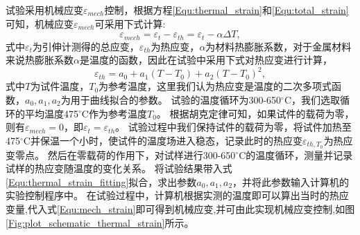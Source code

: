 试验采用机械应变$\varepsilon_{mech}$控制，根据方程\ref{Equ:thermal_strain}和\ref{Equ:total_strain}可知，机械应变$\varepsilon_{mech}$可采用下式计算:
\begin{equation}
\varepsilon_{mech}=\varepsilon_{t}-\varepsilon_{th}=\varepsilon_{t}-\alpha\Delta T,
\label{Equ:mech_strain}
\end{equation}
式中$\varepsilon_{t}$为引伸计测得的总应变，$\varepsilon_{th}$为热应变，$\alpha$为材料热膨胀系数，对于金属材料来说热膨胀系数$\alpha$是温度的函数，因此在试验中采用下式对热应变进行计算，
\begin{equation}
\varepsilon_{th}=a_0+a_1(T-T_0)+a_2(T-T_0)^2,
\label{Equ:thermal_strain_fitting}
\end{equation}
式中$T$为试件温度，$T_0$为参考温度，这里我们认为热应变是温度的二次多项式函数，$a_0,a_1,a_2$为用于曲线拟合的参数。
试验的温度循环为300-650$^\circ$C，我们选取循环的平均温度475$^\circ$C作为参考温度$T_0$。
根据胡克定律可知，如果试件的载荷为零，则有$\varepsilon_{mech}=0$，即$\varepsilon_{t}=\varepsilon_{th}$。
试验过程中我们保持试件的载荷为零，将试件加热至475$^\circ$C并保温一个小时，使试件的温度场进入稳态，记录此时的热应变$\varepsilon_{th,T_0}$为热应变零点。
然后在零载荷的作用下，对试样进行300-650$^\circ$C的温度循环，测量并记录试样的热应变随温度的变化关系。
将试验结果带入式\ref{Equ:thermal_strain_fitting}拟合，求出参数$a_0,a_1,a_2$，并将此参数输入计算机的实验控制程序中。
在试验过程中，计算机根据实测的温度即可以算出当时的热应变量,代入式\ref{Equ:mech_strain}即可得到机械应变,并可由此实现机械应变控制,如图\ref{Fig:plot_schematic_thermal_strain}所示。

